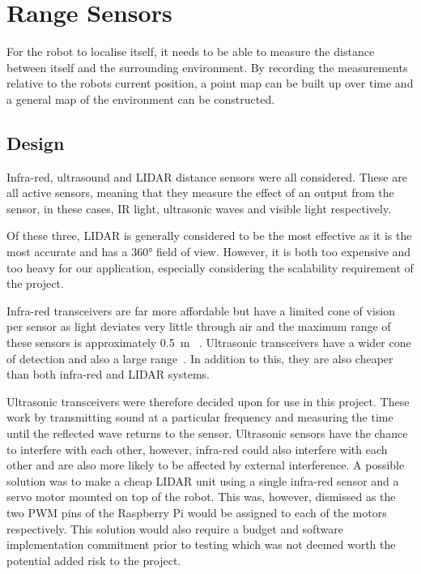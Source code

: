 \section{Range Sensors}\label{elec/range}
For the robot to localise itself, it needs to be able to measure the
distance between itself and the surrounding environment. By recording
the measurements relative to the robots current position, a point map
can be built up over time and a general map of the environment can be
constructed.

\subsection{Design}\label{elec/range/design}
Infra-red, ultrasound and LIDAR distance sensors were all considered. These
are all active sensors, meaning that they measure the effect of an
output from the sensor, in these cases, IR light, ultrasonic waves
and visible light respectively.

Of these three, LIDAR is generally considered to be the most effective
as it is the most accurate and has a \ang{360} field of view. However,
it is both too expensive and too heavy for our application, especially
considering the scalability requirement of the project. 

Infra-red transceivers are far more affordable but have a limited cone of 
vision per sensor as light deviates very little through air and the 
maximum range of these sensors is approximately \SI{0.5}{\m}~
\cite{InfraredDatasheet}. Ultrasonic transceivers have a wider cone of 
detection and also a large range~\cite{HCSR04datasheet}. In addition to 
this, they are also cheaper than both infra-red and LIDAR systems. 

Ultrasonic transceivers were therefore decided upon for use in this
project. These work by transmitting sound at a particular frequency
and measuring the time until the reflected wave returns to the sensor. 
Ultrasonic sensors have the chance to interfere with each other, 
however, infra-red could also interfere with each other and are also 
more likely to be affected by external interference. A possible solution 
was to make a cheap LIDAR unit using a single infra-red sensor and a 
servo motor mounted on top of the robot. This was, however, dismissed as 
the two PWM pins of the Raspberry Pi would be assigned to each of the 
motors respectively. This solution would also require a budget and 
software implementation commitment prior to testing which was not deemed 
worth the potential added risk to the project.   

